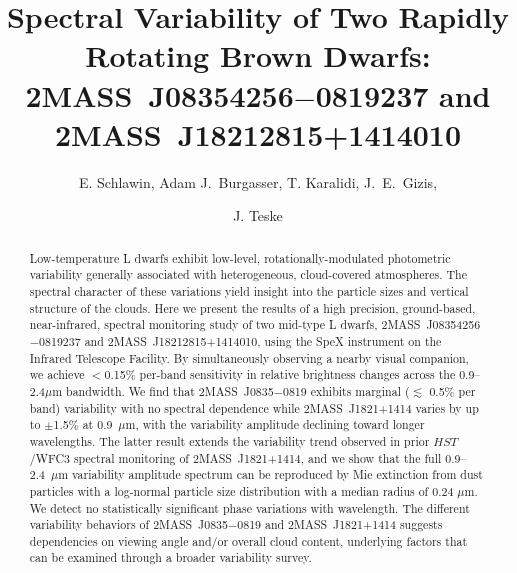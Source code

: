 \documentclass[twocolumn]{aastex6}
\begin{document}
\title{Spectral Variability of Two Rapidly Rotating Brown Dwarfs: \\2MASS~J08354256$-$0819237 and 2MASS~J18212815+1414010}


\author{E. Schlawin, Adam J.\ Burgasser, T. Karalidi, J.\ E.\  Gizis,  \and J. Teske}


\begin{abstract}
Low-temperature L dwarfs exhibit low-level, rotationally-modulated photometric variability generally associated with heterogeneous, cloud-covered atmospheres. The spectral character of these variations yield insight into the particle sizes and vertical structure of the clouds. Here we present the results of a high precision, ground-based, near-infrared, spectral monitoring study of two mid-type L dwarfs, 2MASS~J08354256$-$0819237 and 2MASS~J18212815+1414010, using the SpeX instrument on the Infrared Telescope Facility. By simultaneously observing a nearby visual companion, we achieve $<$0.15\% per-band sensitivity in relative brightness changes across the 0.9--2.4$\mu$m bandwidth. We find that 2MASS~J0835$-$0819 exhibits marginal ($\lesssim$ 0.5\% per band) variability with no spectral dependence while 2MASS~J1821+1414 varies by up to $\pm$1.5\% at 0.9~$\mu$m, with the variability amplitude declining toward longer wavelengths. The latter result extends the variability trend observed in prior $HST$/WFC3 spectral monitoring of 2MASS~J1821+1414, and we show that the full 0.9--2.4~$\mu$m variability amplitude spectrum can be reproduced by Mie extinction from dust particles with a log-normal particle size distribution with a median radius of 0.24 $\mu$m. We detect no statistically significant phase variations with wavelength. The different variability behaviors of 2MASS~J0835$-$0819 and  2MASS~J1821+1414 suggests dependencies on viewing angle and/or overall cloud content, underlying factors that can be examined through a broader variability survey.
\end{abstract}
\end{document}
